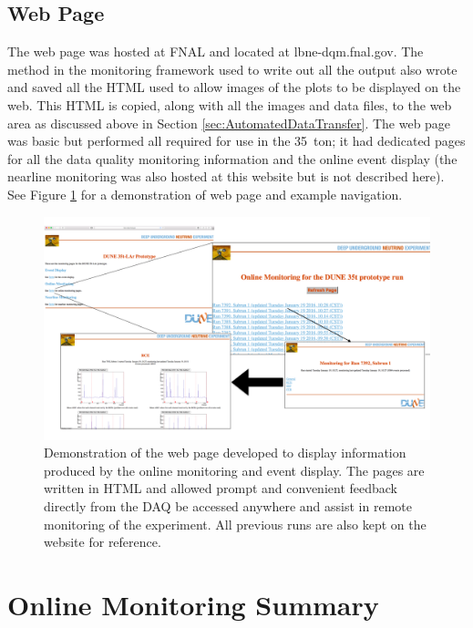 \subsection{Web Page}\label{sec:WebPage}

The web page was hosted at FNAL and located at lbne-dqm.fnal.gov.  The method in the monitoring framework used to write out all the output also wrote and saved all the HTML used to allow images of the plots to be displayed on the web.  This HTML is copied, along with all the images and data files, to the web area as discussed above in Section \ref{sec:AutomatedDataTransfer}.  The web page was basic but performed all required for use in the 35~ton; it had dedicated pages for all the data quality monitoring information and the online event display (the nearline monitoring was also hosted at this website but is not described here).  See Figure \ref{fig:WebPage} for a demonstration of web page and example navigation.

\begin{figure}[ht]
  \centering
  \includegraphics[width=14cm]{webPage.png}
  \caption[Web page for online monitoring and event displays]{Demonstration of the web page developed to display information produced by the online monitoring and event display.  The pages are written in HTML and allowed prompt and convenient feedback directly from the DAQ be accessed anywhere and assist in remote monitoring of the experiment.  All previous runs are also kept on the website for reference.}
  \label{fig:WebPage}
\end{figure}

\section{Online Monitoring Summary}

